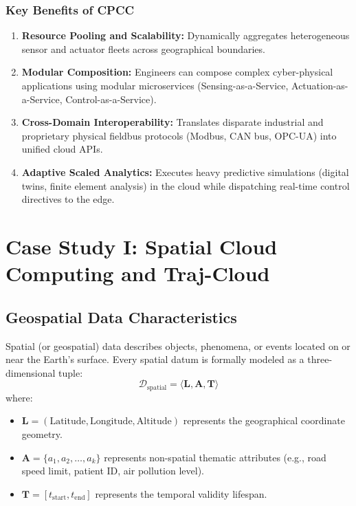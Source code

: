 \subsubsection{Key Benefits of CPCC}
\begin{enumerate}[leftmargin=*]
  \item \textbf{Resource Pooling and Scalability:} Dynamically aggregates heterogeneous sensor and actuator fleets across geographical boundaries.
  \item \textbf{Modular Composition:} Engineers can compose complex cyber-physical applications using modular microservices (Sensing-as-a-Service, Actuation-as-a-Service, Control-as-a-Service).
  \item \textbf{Cross-Domain Interoperability:} Translates disparate industrial and proprietary physical fieldbus protocols (Modbus, CAN bus, OPC-UA) into unified cloud APIs.
  \item \textbf{Adaptive Scaled Analytics:} Executes heavy predictive simulations (digital twins, finite element analysis) in the cloud while dispatching real-time control directives to the edge.
\end{enumerate}

\section{Case Study I: Spatial Cloud Computing and Traj-Cloud}
\subsection{Geospatial Data Characteristics}
Spatial (or geospatial) data describes objects, phenomena, or events located on or near the Earth's surface. Every spatial datum is formally modeled as a three-dimensional tuple:
\begin{equation}
\mathcal{D}_{\text{spatial}} = \langle \mathbf{L}, \mathbf{A}, \mathbf{T} \rangle
\end{equation}
where:
\begin{itemize}[leftmargin=*]
  \item $\mathbf{L} = (\text{Latitude}, \text{Longitude}, \text{Altitude})$ represents the geographical coordinate geometry.
  \item $\mathbf{A} = \{a_1, a_2, \dots, a_k\}$ represents non-spatial thematic attributes (e.g., road speed limit, patient ID, air pollution level).
  \item $\mathbf{T} = [t_{\text{start}}, t_{\text{end}}]$ represents the temporal validity lifespan.
\end{itemize}

